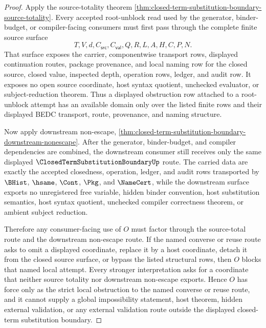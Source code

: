 \begin{proof}
Apply the source-totality theorem \autoref{thm:closed-term-substitution-boundary-source-totality}. Every accepted root-unblock read used by the generator, binder-budget, or compiler-facing consumers must first pass through the complete finite source surface
$$
T,V,d,C_{\mathsf{src}},C_{\mathsf{val}},Q,R,L,A,H,C,P,N.
$$
That surface exposes the carrier, componentwise transport rows, displayed continuation routes, package provenance, and local naming row for the closed source, closed value, inspected depth, operation rows, ledger, and audit row. It exposes no open source coordinate, host syntax quotient, unchecked evaluator, or subject-reduction theorem. Thus a displayed obstruction row attached to a root-unblock attempt has an available domain only over the listed finite rows and their displayed BEDC transport, route, provenance, and naming structure.

Now apply downstream non-escape, \autoref{thm:closed-term-substitution-boundary-downstream-nonescape}. After the generator, binder-budget, and compiler dependencies are combined, the downstream consumer still receives only the same displayed $\ClosedTermSubstitutionBoundaryUp$ route. The carried data are exactly the accepted closedness, operation, ledger, and audit rows transported by $\BHist$, $\hsame$, $\Cont$, $\Pkg$, and $\NameCert$, while the downstream surface exports no unregistered free variable, hidden binder convention, host substitution semantics, host syntax quotient, unchecked compiler correctness theorem, or ambient subject reduction.

Therefore any consumer-facing use of $O$ must factor through the source-total route and the downstream non-escape route. If the named converse or reuse route asks to omit a displayed coordinate, replace it by a host coordinate, detach it from the closed source surface, or bypass the listed structural rows, then $O$ blocks that named local attempt. Every stronger interpretation asks for a coordinate that neither source totality nor downstream non-escape exports. Hence $O$ has force only as the strict local obstruction to the named converse or reuse route, and it cannot supply a global impossibility statement, host theorem, hidden external validation, or any external validation route outside the displayed closed-term substitution boundary.
\end{proof}
